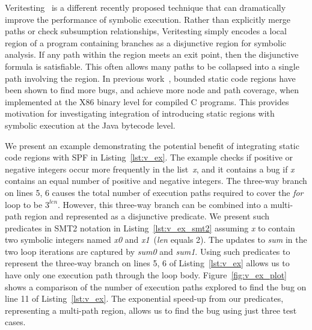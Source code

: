 %
Veritesting~\cite{veritesting} is a different recently proposed technique that can dramatically improve the performance of symbolic execution.  Rather than explicitly merge paths or check subsumption relationships, Veritesting simply encodes a local region of a program containing branches as a disjunctive region for symbolic analysis.  If any path within the region meets an exit point, then the disjunctive formula is satisfiable.  This often allows many paths to be collapsed into a single path involving the region.  
%
In previous work~\cite{veritesting}, bounded static code regions have been shown to find more bugs, and achieve more node and path coverage, when implemented at the X86 binary level for compiled C programs.
%
This provides motivation for investigating integration of introducing static regions with symbolic execution at the Java bytecode level.





%
%
We present an example demonstrating the potential benefit of integrating static code regions with SPF in Listing~\ref{lst:v_ex}.
%
The example checks if positive or negative integers occur more frequently in the
list~\textit{x}, and it contains a bug if \textit{x} contains an
equal number of positive and negative integers.
%
The three-way branch on lines 5, 6 causes the total number of execution
paths required to cover the \textit{for} loop to be $3^{\textit{len}}$.
%
However, this three-way branch can be combined into a multi-path region
and represented as a disjunctive predicate.
We present such predicates in SMT2 notation in
Listing~\ref{lst:v_ex_smt2} assuming \textit{x} to contain two symbolic
integers named \textit{x0} and \textit{x1}~(\textit{len} equals 2).
%
The updates to \textit{sum} in the two loop iterations are captured by
\textit{sum0} and \textit{sum1}.
%
Using such predicates to represent the three-way branch on lines 5, 6 of
Listing~\ref{lst:v_ex} allows us to have only one execution path through
the loop body.
%
Figure~\ref{fig:v_ex_plot} shows a comparison of the number of execution
paths explored to find the bug on line 11 of Listing~\ref{lst:v_ex}.
%
The exponential speed-up from our predicates, representing a multi-path
region, allows us to find
the bug using just three test cases.

